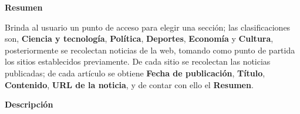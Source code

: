 
\begin{large}
	\textbf{Resumen}\\
\end{large}

Brinda al usuario un punto de acceso para elegir una sección; las clasificaciones son, \textbf{Ciencia y tecnología}, \textbf{Política}, \textbf{Deportes}, \textbf{Economía} y  \textbf{Cultura}, posteriormente se recolectan noticias de la web, tomando como punto de partida los sitios establecidos previamente. De cada sitio se recolectan las noticias publicadas; de cada artículo se obtiene \textbf{Fecha de publicación}, \textbf{Título}, \textbf{Contenido}, \textbf{URL de la noticia}, y de contar con ello el \textbf{Resumen}.\\

\begin{large}
	\textbf{Descripción}\\
\end{large} 


